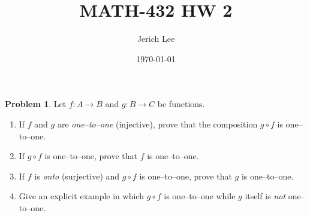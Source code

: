 \documentclass[12pt]{article}
\title{MATH-432 HW 2}
\author{Jerich Lee}
\date{\today}
\theoremstyle{definition} %
\newtheorem{problem}{Problem}
\theoremstyle{plain} %
\begin{document}
\maketitle
\begin{problem}
  Let \(f:A\to B\) and \(g:B\to C\) be functions.
  
  \begin{enumerate}[label=(\alph*)]
      \item If \(f\) and \(g\) are \emph{one–to–one} (injective), prove that
            the composition \(g\circ f\) is one–to–one.
      \item If \(g\circ f\) is one–to–one, prove that \(f\) is one–to–one.
      \item If \(f\) is \emph{onto} (surjective) and \(g\circ f\) is one–to–one,
            prove that \(g\) is one–to–one.
      \item Give an explicit example in which \(g\circ f\) is one–to–one
            while \(g\) itself is \emph{not} one–to–one.
  \end{enumerate}
  \end{problem}
  
\end{document}
